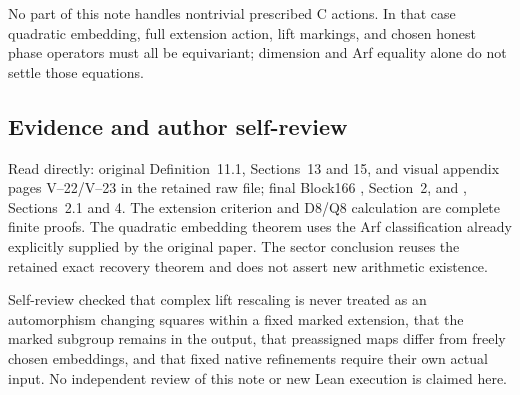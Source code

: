 No part of this note handles nontrivial prescribed C actions. In that
case quadratic embedding, full extension action, lift markings, and
chosen honest phase operators must all be equivariant; dimension and Arf
equality alone do not settle those equations.

\hypertarget{dyadic_markings-evidence-and-author-self-review}{%
\subsection{Evidence and author
self-review}\label{dyadic_markings-evidence-and-author-self-review}}

Read directly: original Definition~11.1, Sections~13 and 15, and visual
appendix pages V--22/V--23 in the retained raw file; final Block166
, Section~2, and , Sections~2.1
and 4. The extension criterion and D8/Q8 calculation are complete finite
proofs. The quadratic embedding theorem uses the Arf classification
already explicitly supplied by the original paper. The sector conclusion
reuses the retained exact recovery theorem and does not assert new
arithmetic existence.

Self-review checked that complex lift rescaling is never treated as an
automorphism changing squares within a fixed marked extension, that the
marked subgroup remains in the output, that preassigned maps differ from
freely chosen embeddings, and that fixed native refinements require
their own actual input. No independent review of this note or new Lean
execution is claimed here.
